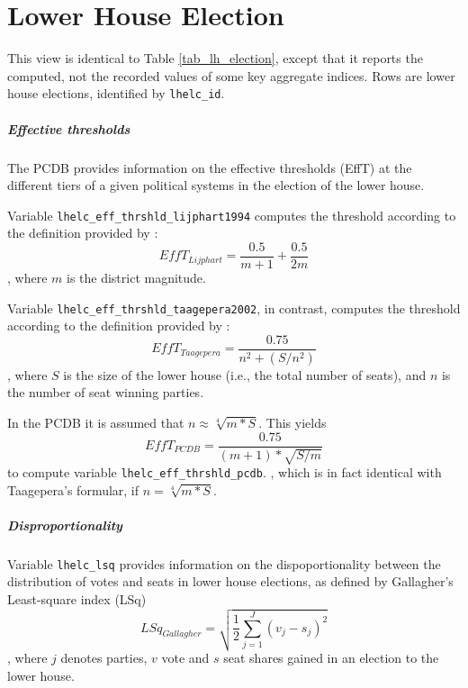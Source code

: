 \section{Lower House Election}\label{sec_view_lh_election}
This view is identical to Table \ref{tab_lh_election}, except that it reports the computed, not the recorded values of some key aggregate indices.
Rows are lower house elections, identified by \texttt{\footnotesize lhelc\_id}.

\subparagraph{Effective thresholds}
The PCDB provides information on the effective thresholds (EffT) at the different tiers of a given political systems in the election of the lower house.

Variable \texttt{\footnotesize lhelc\_eff\_thrshld\_lijphart1994} computes the threshold according to the definition provided by \citet{Lijphart1994}: 
\begin{equation}\label{EffT_Lijphart_equation}
EffT_{Lijphart}=\frac{0.5}{m+1}+\frac{0.5}{2m} 
\end{equation}, where $m$ is the district magnitude.

Variable \texttt{\footnotesize lhelc\_eff\_thrshld\_taagepera2002}, in contrast, computes the threshold according to the definition provided by \citet[p.\,309]{Taagepera2002}: 
\begin{equation}\label{EffT_Taagepera_equation}
EffT_{Taagepera}=\frac{0.75}{n^{2}+(S/n^{2})}
\end{equation}, where $S$ is the size of the lower house (i.e., the total number of seats), and $n$ is the number of seat winning parties.

In the PCDB it is assumed that $n \approx \sqrt[4]{m*S}$. This yields
\begin{equation}\label{EffT_PCDB_equation}
EffT_{PCDB}=\frac{0.75}{(m+1)*\sqrt{S/m}}
\end{equation} to compute variable \texttt{\footnotesize lhelc\_eff\_thrshld\_pcdb}.
, which is in fact identical with Taagepera's formular, if $n = \sqrt[4]{m*S}$.

\subparagraph{Disproportionality} Variable \texttt{\footnotesize lhelc\_lsq} provides information on the dispoportionality between the distribution of votes and seats in lower house elections, as defined by Gallagher's  \citeyearpar{Gallagher1991} Least-square index (LSq)
\begin{equation}\label{LSq_equation}
LSq_{Gallagher}=\sqrt{\frac{1}{2}\sum\limits_{j=1}^{J} (v_{j}-s_{j})^{2}}
\end{equation}, where $j$ denotes parties, $v$ vote and $s$ seat shares gained in an election to the lower house. 

